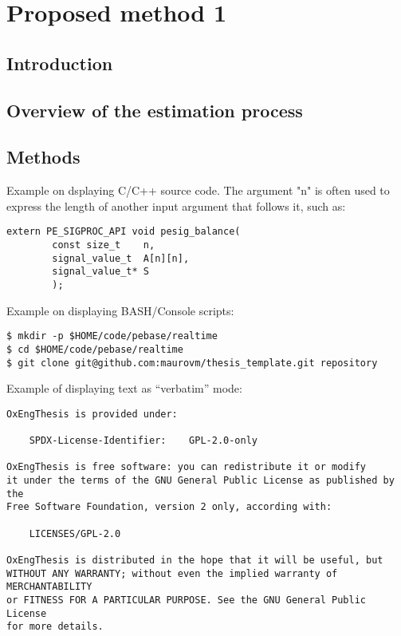 \chapter{Proposed method 1}
\label{chapter:method_1} 


\section{Introduction}

\lipsum[2-4]

\section{Overview of the estimation process}

\lipsum[2-4]

\section{Methods}

\lipsum[2-4]

Example on dsplaying C/C++ source code. The argument "n" is often used to express the length of another input argument that follows it, such as:

\begin{lstlisting}[style=custom-c,caption={Function to balance a matrix.}]
extern PE_SIGPROC_API void pesig_balance(
        const size_t    n,
        signal_value_t  A[n][n],
        signal_value_t* S
        );
\end{lstlisting}

Example on displaying BASH/Console scripts:

\begin{lstlisting}[style=custom-bash,caption={A script in bash.}]
$ mkdir -p $HOME/code/pebase/realtime
$ cd $HOME/code/pebase/realtime
$ git clone git@github.com:maurovm/thesis_template.git repository
\end{lstlisting}

Example of displaying text as ``verbatim'' mode:

\begin{lstlisting}[style=custom-verbatim,caption={License information.}]
OxEngThesis is provided under:

    SPDX-License-Identifier:    GPL-2.0-only
    
OxEngThesis is free software: you can redistribute it or modify
it under the terms of the GNU General Public License as published by the
Free Software Foundation, version 2 only, according with:

    LICENSES/GPL-2.0

OxEngThesis is distributed in the hope that it will be useful, but
WITHOUT ANY WARRANTY; without even the implied warranty of MERCHANTABILITY
or FITNESS FOR A PARTICULAR PURPOSE. See the GNU General Public License
for more details.
\end{lstlisting}


